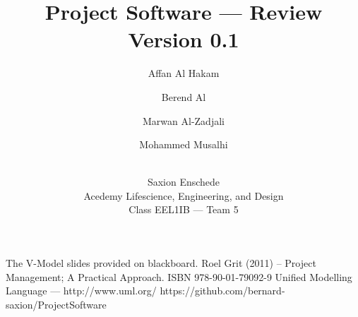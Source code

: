 \documentclass[oneside,a4paper,11pt,titlepage,openany]{report}
\author{
Affan Al Hakam \and 
Berend Al \and
Marwan Al-Zadjali \and
Mohammed Musalhi \and
\\
Saxion Enschede \\
Acedemy Lifescience, Engineering, and Design \\
Class EEL1IB --- Team 5
}
\title{Project Software --- Review\\\normalsize Version 0.1}
\begin{document}
\maketitle
\tableofcontents
\listoffigures



%


\begin{thebibliography}{99}
The V-Model slides provided on blackboard.
Roel Grit (2011) -- Project Management; A Practical Approach. ISBN 978-90-01-79092-9
Unified Modelling Language --- http://www.uml.org/
https://github.com/bernard-saxion/ProjectSoftware
\end{thebibliography}
\end{document}
